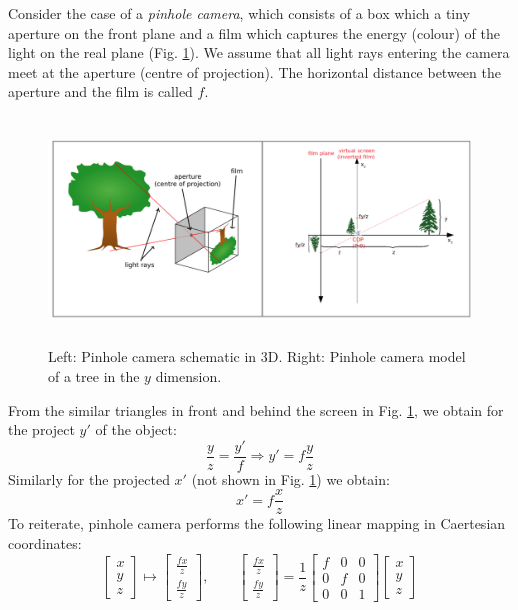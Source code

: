 \documentclass[a4paper]{article}
\begin{document}
%
   Consider the case of a \textit{pinhole camera}, which consists of a box which a tiny aperture on the front plane and a film which captures the energy (colour) of the light on the real plane (Fig. \ref{fig:pinhole_model}). We assume that all light rays entering the camera meet at the aperture (centre of projection). The horizontal distance between the aperture and the film is called  $f$.
    \begin{figure}[H]
        \centering
        \includegraphics[height=6cm]{img/pinhole_model.png}
        \caption{Left: Pinhole camera schematic in 3D. Right: Pinhole camera model of a tree in the $y$ dimension.}
        \label{fig:pinhole_model}
    \end{figure}

    From the similar triangles in front and behind the screen in Fig. \ref{fig:pinhole_model}, we obtain for the project $y\prime$ of the object:
    \[
        \frac{y}{z} = \frac{y\prime}{f} \Rightarrow y\prime = f\frac{y}{z}
    \]
    Similarly for the projected $x\prime$ (not shown in Fig. \ref{fig:pinhole_model}) we obtain:
    \[
        x\prime = f\frac{x}{z}
    \]
    To reiterate, pinhole camera performs the following linear mapping in Caertesian coordinates:
    \[
        \begin{bmatrix}
            x \\ y \\ z
        \end{bmatrix} \mapsto
        \begin{bmatrix}
            \frac{fx}{z} \\
            \frac{fy}{z} 
        \end{bmatrix}, \qquad 
        \begin{bmatrix}
            \frac{fx}{z} \\
            \frac{fy}{z} 
        \end{bmatrix} = 
         \frac{1}{z}\begin{bmatrix}
            f & 0 & 0 \\
            0 & f & 0 \\
            0 & 0 & 1
        \end{bmatrix}
        \begin{bmatrix}
            x \\ y \\ z
        \end{bmatrix}
        \]
\end{document}
